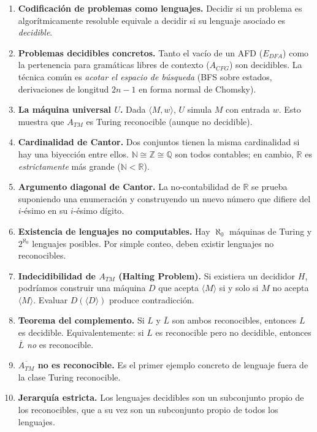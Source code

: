 \documentclass[11pt,a4paper]{article}
\theoremstyle{definicion}
\newcommand{\enc}[1]{\langle #1 \rangle}
\newcommand{\N}{\mathbb{N}}
\newcommand{\Z}{\mathbb{Z}}
\newcommand{\Q}{\mathbb{Q}}
\newcommand{\R}{\mathbb{R}}
\begin{document}
\begin{enumerate}
    \item \textbf{Codificación de problemas como lenguajes.} Decidir si un problema es algorítmicamente resoluble equivale a decidir si su lenguaje asociado es \emph{decidible}.

    \item \textbf{Problemas decidibles concretos.} Tanto el vacío de un AFD ($E_{DFA}$) como la pertenencia para gramáticas libres de contexto ($A_{CFG}$) son decidibles. La técnica común es \emph{acotar el espacio de búsqueda} (BFS sobre estados, derivaciones de longitud $2n-1$ en forma normal de Chomsky).

    \item \textbf{La máquina universal $U$.} Dada $\enc{M, w}$, $U$ simula $M$ con entrada $w$. Esto muestra que $A_{TM}$ es Turing reconocible (aunque no decidible).

    \item \textbf{Cardinalidad de Cantor.} Dos conjuntos tienen la misma cardinalidad si hay una biyección entre ellos. $\N \cong \Z \cong \Q$ son todos contables; en cambio, $\R$ es \emph{estrictamente} más grande ($\N < \R$).

    \item \textbf{Argumento diagonal de Cantor.} La no-contabilidad de $\R$ se prueba suponiendo una enumeración y construyendo un nuevo número que difiere del $i$-ésimo en su $i$-ésimo dígito.

    \item \textbf{Existencia de lenguajes no computables.} Hay $\aleph_0$ máquinas de Turing y $2^{\aleph_0}$ lenguajes posibles. Por simple conteo, deben existir lenguajes no reconocibles.

    \item \textbf{Indecidibilidad de $A_{TM}$ (Halting Problem).} Si existiera un decididor $H$, podríamos construir una máquina $D$ que acepta $\enc{M}$ si y solo si $M$ no acepta $\enc{M}$. Evaluar $D(\enc{D})$ produce contradicción.

    \item \textbf{Teorema del complemento.} Si $L$ y $\overline{L}$ son ambos reconocibles, entonces $L$ es decidible. Equivalentemente: si $L$ es reconocible pero no decidible, entonces $\overline{L}$ \emph{no} es reconocible.

    \item \textbf{$\overline{A_{TM}}$ no es reconocible.} Es el primer ejemplo concreto de lenguaje fuera de la clase Turing reconocible.

    \item \textbf{Jerarquía estricta.} Los lenguajes decidibles son un subconjunto propio de los reconocibles, que a su vez son un subconjunto propio de todos los lenguajes.
\end{enumerate}
\end{document}

